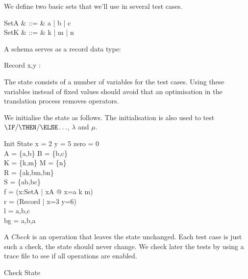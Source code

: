 \documentclass{article}
\begin{document}
We define two basic sets that we'll use in several test cases.
\begin{syntax}
  SetA & ::= & a | b | c\\
  SetK & ::= & k | m | n\\
\end{syntax}
A schema serves as a record data type:
\begin{schema}{Record}
  x,y : \nat
\end{schema}
The state consists of a number of variables for the test cases. Using these
variables instead of fixed values should avoid that an optimisation in the
translation process removes operators.
We initialise the state as follows. The initialisation is also used to test
$\IF/\THEN/\ELSE \ldots$, $\lambda$ and $\mu$.
\begin{schema}{Init}
  State
  \where
  x = 2 \land y = 5 \land zero = 0\\
  A = \{a,b\} \land B = \{b,c\}\\
  K = \{k,m\} \land M = \{n\} \\
  R = \{a\mapsto k,b\mapsto m,b\mapsto n\}\\
  S = \{a\mapsto b,b\mapsto c\}\\
  f = (\lambda x:SetA | x\in A @ \IF x=a \THEN k \ELSE m)\\
  r = (\mu Record | x=3 \land y=6)\\
  l = \langle a,b,c \rangle\\
  bg = \lbag a,b,a \rbag\\
\end{schema}
A $Check$ is an operation that leaves the state unchanged. Each test case is just such a check,
the state should never change. We check later the tests by using a trace file to see if all
operations are enabled.
\begin{zed}
  Check  \Xi State\\
\end{zed}
\end{document}
